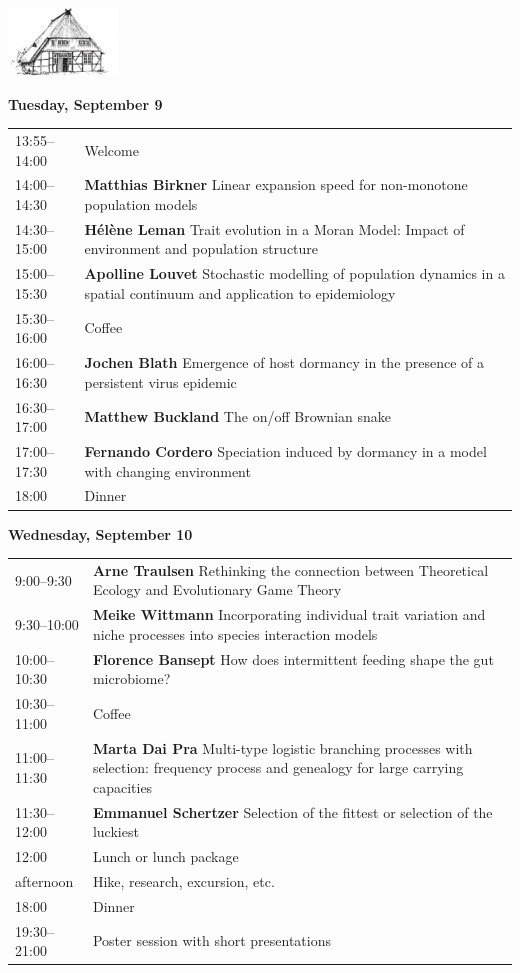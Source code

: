 \documentclass[12pt,a4paper]{article}
\newcommand{\Kopf}{%
\begin{center}%
\includegraphics[width=.2\textwidth]{logo-tsh}\\[2ex]
\end{center}
}
\begin{document}
\pagebreak 
\pagestyle{headings}
\renewcommand{\arraystretch}{1.85}

\Kopf
\vspace*{.75cm}

\textbf{\Large Tuesday, September 9}\medskip

\begin{tabular}{@{}l p{}@{}}
13:55--14:00 & Welcome \\
14:00--14:30 &\textbf{Matthias Birkner } Linear expansion speed for non-monotone population models \\
14:30--15:00 &\textbf{Hélène Leman } Trait evolution in a Moran Model: Impact of environment and population structure \\
15:00--15:30 &\textbf{Apolline Louvet } Stochastic modelling of population dynamics in a spatial continuum and application to epidemiology \\
15:30--16:00 & Coffee \\
16:00--16:30 &\textbf{Jochen Blath } Emergence of host dormancy in the presence of a persistent virus epidemic \\
16:30--17:00 &\textbf{Matthew Buckland } The on/off Brownian snake \\
17:00--17:30 &\textbf{Fernando Cordero } Speciation induced by dormancy in a model with changing environment \\
18:00 & Dinner \\
\end{tabular}

\newpage

\textbf{\Large Wednesday, September 10}\medskip

\begin{tabular}{@{}l p{}@{}}
9:00--9:30 &\textbf{Arne Traulsen } Rethinking the connection between Theoretical Ecology and Evolutionary Game Theory \\
9:30--10:00 &\textbf{Meike Wittmann } Incorporating individual trait variation and niche processes into species interaction models \\
10:00--10:30 &\textbf{Florence Bansept } How does intermittent feeding shape the gut microbiome? \\
10:30--11:00 & Coffee \\
11:00--11:30 &\textbf{Marta Dai Pra } Multi-type logistic branching processes with selection: frequency process and genealogy for large carrying capacities \\
11:30--12:00 &\textbf{Emmanuel Schertzer } Selection of the fittest or selection of the luckiest \\
12:00 & Lunch or lunch package \\
afternoon & Hike, research, excursion, etc. \\
18:00 & Dinner \\
19:30--21:00 & Poster session with short presentations \\
\end{tabular}
\end{document}
